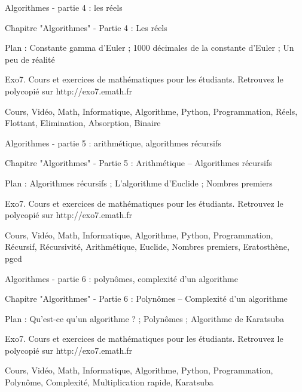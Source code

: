 
Algorithmes - partie 4 : les réels



Chapitre "Algorithmes" - Partie 4 : Les réels

Plan : Constante gamma d'Euler ; 1000 décimales de la constante d'Euler ; Un peu de réalité

Exo7. Cours et exercices de mathématiques pour les étudiants.
Retrouvez le polycopié sur http://exo7.emath.fr


Cours, Vidéo, Math, Informatique, Algorithme, Python, Programmation, Réels, Flottant, Elimination, Absorption, Binaire




Algorithmes - partie 5 : arithmétique, algorithmes récursifs



Chapitre "Algorithmes" - Partie 5 : Arithmétique -- Algorithmes récursifs

Plan : Algorithmes récursifs ; L'algorithme d'Euclide ; Nombres premiers

Exo7. Cours et exercices de mathématiques pour les étudiants.
Retrouvez le polycopié sur http://exo7.emath.fr


Cours, Vidéo, Math, Informatique, Algorithme, Python, Programmation, Récursif, Récursivité, Arithmétique, Euclide, Nombres premiers, Eratosthène, pgcd




Algorithmes - partie 6 : polynômes, complexité d'un algorithme



Chapitre "Algorithmes" - Partie 6 : Polynômes -- Complexité d'un algorithme

Plan : Qu'est-ce qu'un algorithme ? ; Polynômes ; Algorithme de Karatsuba 

Exo7. Cours et exercices de mathématiques pour les étudiants.
Retrouvez le polycopié sur http://exo7.emath.fr


Cours, Vidéo, Math, Informatique, Algorithme, Python, Programmation, Polynôme, Complexité, Multiplication rapide, Karatsuba 


